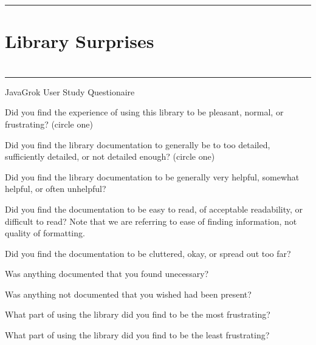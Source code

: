\documentclass{article}
\let\Enumerate =\enumerate
\def\Nospacing{\itemsep=0pt\topsep=0pt\partopsep=0pt\parskip=0pt\parsep=0pt}
\renewenvironment{enumerate}{\Enumerate\Nospacing}{\endlist}
\begin{document}
\section*{}
\hrule
\vspace{0.2in}


\section*{Library Surprises}
\section*{}
\section*{}
\hrule
\vspace{0.2in}

\newpage

\begin{center}
\LARGE JavaGrok User Study Questionaire
\end{center}

\begin{enumerate}
\item Did you find the experience of using this library to be pleasant, normal,
or frustrating? (circle one)\\
\item Did you find the library documentation to generally be to too detailed, sufficiently
detailed, or not detailed enough? (circle one)\\
\item Did you find the library documentation to be generally very helpful,
somewhat helpful, or often unhelpful?\\
\item Did you find the documentation to be easy to read, of acceptable
readability, or difficult to read?  Note that we are referring to ease of
finding information, not quality of formatting.\\
\item Did you find the documentation to be cluttered, okay, or spread out too
far?\\
\item Was anything documented that you found unecessary?\\\vspace{1in}
\item Was anything not documented that you wished had been present?\\\vspace{1in}
\item What part of using the library did you find to be the most
frustrating?\\\vspace{1in}
\item What part of using the library did you find to be the least
frustrating?\\\vspace{1in}
\end{enumerate}
\end{document}
